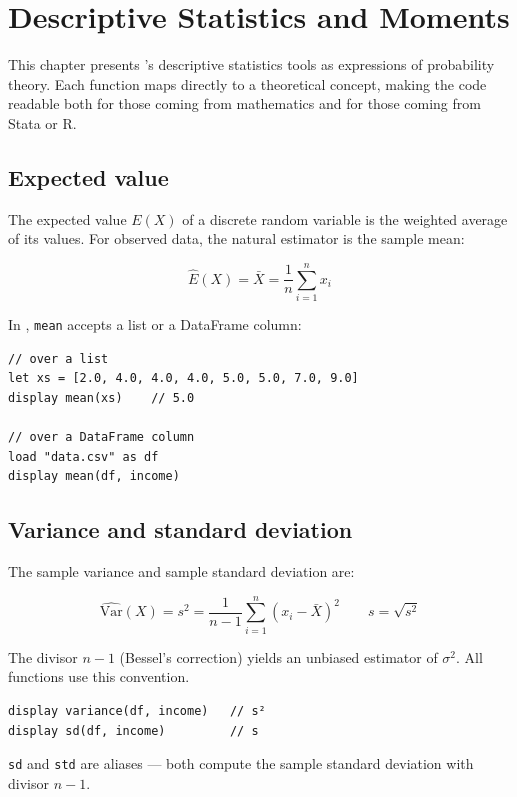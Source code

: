 \chapter{Descriptive Statistics and Moments}
\label{cap:probabilidade}

This chapter presents \hayashi{}'s descriptive statistics tools as
expressions of probability theory. Each function maps directly to a
theoretical concept, making the code readable both for those coming from
mathematics and for those coming from Stata or R.

\section{Expected value}

The expected value $E(X)$ of a discrete random variable is the
weighted average of its values. For observed data, the natural estimator
is the sample mean:

\[
  \hat{E}(X) = \bar{X} = \frac{1}{n}\sum_{i=1}^{n} x_i
\]

In \hayashi{}, \lstinline{mean} accepts a list or a DataFrame column:

\begin{lstlisting}[caption={E(X) over a list and over a column}]
// over a list
let xs = [2.0, 4.0, 4.0, 4.0, 5.0, 5.0, 7.0, 9.0]
display mean(xs)    // 5.0

// over a DataFrame column
load "data.csv" as df
display mean(df, income)
\end{lstlisting}

\section{Variance and standard deviation}

The sample variance and sample standard deviation are:

\[
  \widehat{\mathrm{Var}}(X) = s^2 = \frac{1}{n-1}\sum_{i=1}^{n}(x_i - \bar{X})^2
  \qquad
  s = \sqrt{s^2}
\]

The divisor $n-1$ (Bessel's correction) yields an unbiased estimator of
$\sigma^2$. All \hayashi{} functions use this convention.

\begin{lstlisting}[caption={Variance and standard deviation}]
display variance(df, income)   // s²
display sd(df, income)         // s
\end{lstlisting}

\begin{nota}
  \lstinline{sd} and \lstinline{std} are aliases — both compute the sample
  standard deviation with divisor $n-1$.
\end{nota}

